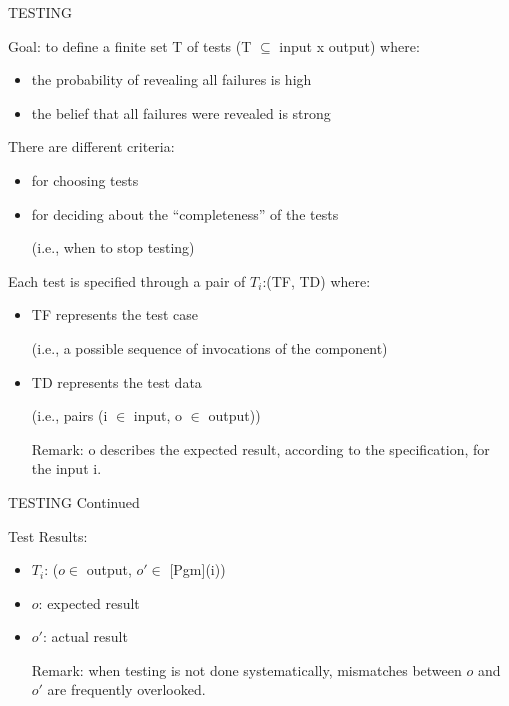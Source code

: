 \newpage

\centerline{TESTING}         %
\bigskip

Goal: to define a finite set T of tests (T $\subseteq$ input x output)
where:
\begin{itemize}

\item the probability of revealing all failures is high
\item the belief that all failures were revealed is strong

\end{itemize}

There are different criteria:
\begin{itemize}
\item for choosing tests
\item for deciding about the ``completeness'' of the tests 

(i.e., when to stop testing)
\end{itemize}

Each test is specified through a pair of $T_i$:(TF, TD) where:
\begin{itemize}

\item TF represents the test case 

(i.e., a possible sequence of invocations of the component)


\item TD represents the test data

(i.e., pairs (i $\in$ input, o $\in$ output))

Remark: o describes the expected result, according to the 
specification, for the input i.

\end{itemize}


\newpage
\centerline{TESTING Continued}         %
\bigskip

Test Results:

\begin{itemize}

\item $T_i$: ($o \in$ output, $o' \in$ [Pgm](i))

\item $o$: expected result

\item $o'$: actual result

Remark: when testing is not done systematically, mismatches between
$o$ and $o'$ are frequently overlooked.

\end{itemize}



